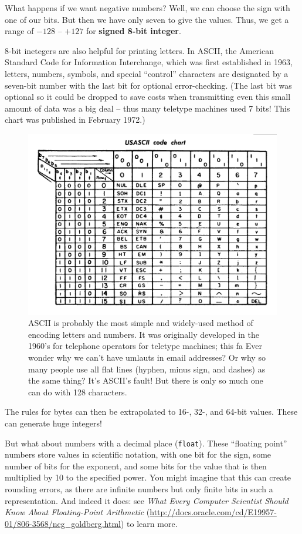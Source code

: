\documentclass[a4paper,10pt]{scrartcl}
\begin{document}
What happens if we want negative numbers? Well, we can choose the sign with one of our bits. But then we have only seven to give the values. Thus, we get a range of $-128$ -- $+127$ for \textbf{signed 8-bit integer}.

8-bit inetegers are also helpful for printing letters. In ASCII, the American Standard Code for Information Interchange, which was first established in 1963, letters, numbers, symbols, and special ``control'' characters are designated by a seven-bit number with the last bit for optional error-checking. (The last bit was optional so it could be dropped to save costs when transmitting even this small amount of data was a big deal -- thus many teletype machines used 7 bits! This chart was published in February 1972.)

\begin{figure}[!ht]
\begin{center}
\includegraphics[width=.8\linewidth]{figures/Introduction/ASCII_Code_Chart-Quick_ref_card.png}
\end{center}
\caption{ASCII is probably the most simple and widely-used method of encoding letters and numbers. It was originally developed in the 1960's for telephone operators for teletype machines; this fa Ever wonder why we can't have umlauts in email addresses? Or why so many people use all flat lines (hyphen, minus sign, and dashes) as the same thing? It's ASCII's fault! But there is only so much one can do with 128 characters.}
\end{figure}

The rules for bytes can then be extrapolated to 16-, 32-, and 64-bit values. These can generate huge integers!

But what about numbers with a decimal place (\lstinline{float}). These ``floating point'' numbers store values in scientific notation, with one bit for the sign, some number of bits for the exponent, and some bits for the value that is then multiplied by 10 to the specified power. You might imagine that this can create rounding errors, as there are infinite numbers but only finite bits in such a representation. And indeed it does: see \emph{What Every Computer Scientist Should Know About Floating-Point Arithmetic} (\url{http://docs.oracle.com/cd/E19957-01/806-3568/ncg_goldberg.html}) to learn more.
\end{document}
